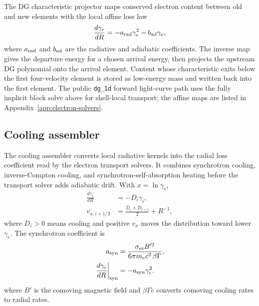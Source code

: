 \documentclass[twocolumn]{aastex702}
\begin{document}
The DG characteristic projector maps conserved electron content between old and
new elements with the local affine loss law
\begin{equation}
\frac{d\gamma_e}{dR}=-a_{\rm rad}\gamma_e^2-b_{\rm ad}\gamma_e,
\end{equation}
where \(a_{\rm rad}\) and \(b_{\rm ad}\) are the radiative and adiabatic
coefficients.  The inverse map gives the departure energy for a chosen arrival
energy, then projects the upstream DG polynomial onto the arrival element.
Content whose characteristic exits below the first four-velocity element is
stored as low-energy mass and written back into the first element.  The public
\texttt{dg\_1d} forward light-curve path uses the fully implicit block solve
above for shell-local transport; the affine maps are listed in
Appendix~\ref{app:electron-solvers}.

\subsection{Cooling assembler}

The cooling assembler converts local radiative kernels into the radial loss
coefficient read by the electron transport solvers.  It combines synchrotron
cooling, inverse-Compton cooling, and synchrotron-self-absorption heating before
the transport solver adds adiabatic drift.  With \(x=\ln\gamma_e\),
\begin{equation}
\begin{aligned}
\frac{d\gamma_i}{dR}&=-D_i\gamma_i,\\
v_{x,i+1/2}
&=\frac{D_i+D_{i+1}}{2}+R^{-1},
\end{aligned}
\end{equation}
where \(D_i>0\) means cooling and positive \(v_x\) moves the distribution toward
lower \(\gamma_e\).  The synchrotron coefficient is
\begin{equation}
\begin{aligned}
a_{\rm syn}&=\frac{\sigma_{\rm es} B'^2}{6\pi m_e c^2\,\beta\Gamma},\\
\left.\frac{d\gamma_i}{dR}\right|_{\rm syn}
&=-a_{\rm syn}\gamma_i^2 .
\end{aligned}
\end{equation}
where \(B'\) is the comoving magnetic field and \(\beta\Gamma c\) converts
comoving cooling rates to radial rates.
\end{document}
